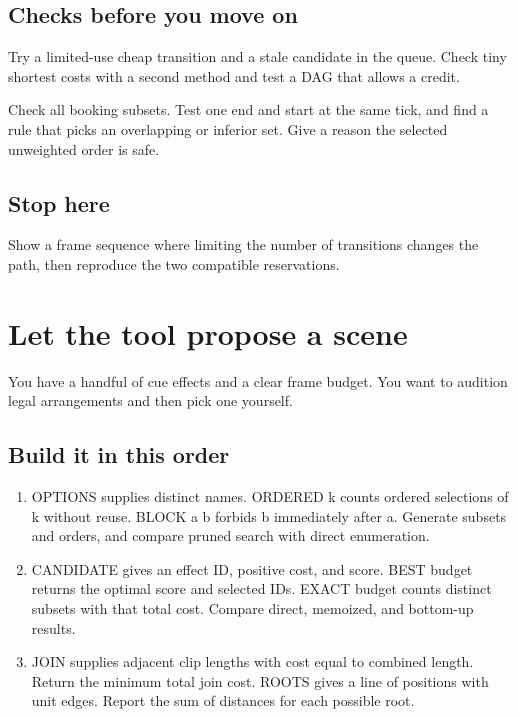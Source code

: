 \documentclass[11pt,letterpaper]{article}
\begin{document}
\subsection*{Checks before you move on}

Try a limited-use cheap transition and a stale candidate in the queue. Check tiny shortest costs with a second method and test a DAG that allows a credit.

Check all booking subsets. Test one end and start at the same tick, and find a rule that picks an overlapping or inferior set. Give a reason the selected unweighted order is safe.

\subsection*{Stop here}

Show a frame sequence where limiting the number of transitions changes the path, then reproduce the two compatible reservations.

\clearpage

\section{Let the tool propose a scene}\label{visuals:06}

You have a handful of cue effects and a clear frame budget. You want to audition legal arrangements and then pick one yourself.

\subsection*{Build it in this order}

\begin{enumerate}
\item OPTIONS supplies distinct names. ORDERED k counts ordered selections of k without reuse. BLOCK a b forbids b immediately after a. Generate subsets and orders, and compare pruned search with direct enumeration.
\item CANDIDATE gives an effect ID, positive cost, and score. BEST budget returns the optimal score and selected IDs. EXACT budget counts distinct subsets with that total cost. Compare direct, memoized, and bottom-up results.
\item JOIN supplies adjacent clip lengths with cost equal to combined length. Return the minimum total join cost. ROOTS gives a line of positions with unit edges. Report the sum of distances for each possible root.
\end{enumerate}
\end{document}

